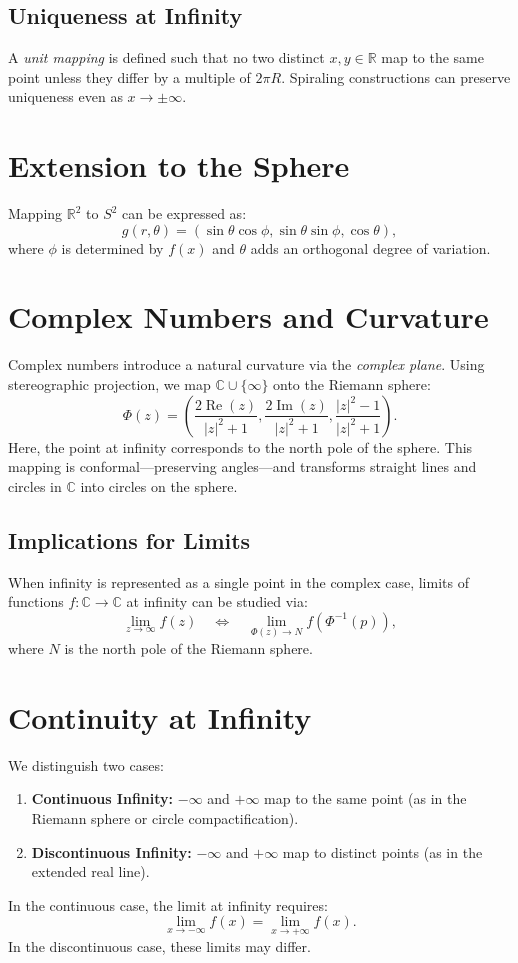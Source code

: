 \documentclass[12pt]{article}
\begin{document}
\subsection{Uniqueness at Infinity}
A \emph{unit mapping} is defined such that no two distinct $x,y \in \mathbb{R}$ map to the same point unless they differ by a multiple of $2\pi R$. Spiraling constructions can preserve uniqueness even as $x \to \pm\infty$.

\section{Extension to the Sphere}
Mapping $\mathbb{R}^2$ to $S^2$ can be expressed as:
\begin{equation}
g(r, \theta) = (\sin\theta \cos\phi, \sin\theta \sin\phi, \cos\theta),
\end{equation}
where $\phi$ is determined by $f(x)$ and $\theta$ adds an orthogonal degree of variation.

\section{Complex Numbers and Curvature}
Complex numbers introduce a natural curvature via the \emph{complex plane}. Using stereographic projection, we map $\mathbb{C} \cup \{\infty\}$ onto the Riemann sphere:
\begin{equation}
\Phi(z) = \left( \frac{2 \operatorname{Re}(z)}{|z|^2 + 1}, \frac{2 \operatorname{Im}(z)}{|z|^2 + 1}, \frac{|z|^2 - 1}{|z|^2 + 1} \right).
\end{equation}
Here, the point at infinity corresponds to the north pole of the sphere.  
This mapping is conformal—preserving angles—and transforms straight lines and circles in $\mathbb{C}$ into circles on the sphere.

\subsection{Implications for Limits}
When infinity is represented as a single point in the complex case, limits of functions $f: \mathbb{C} \to \mathbb{C}$ at infinity can be studied via:
\[
\lim_{z \to \infty} f(z) \quad \Leftrightarrow \quad \lim_{\Phi(z) \to N} f(\Phi^{-1}(p)),
\]
where $N$ is the north pole of the Riemann sphere.

\section{Continuity at Infinity}
We distinguish two cases:
\begin{enumerate}
    \item \textbf{Continuous Infinity:} $-\infty$ and $+\infty$ map to the same point (as in the Riemann sphere or circle compactification).
    \item \textbf{Discontinuous Infinity:} $-\infty$ and $+\infty$ map to distinct points (as in the extended real line).
\end{enumerate}
In the continuous case, the limit at infinity requires:
\[
\lim_{x \to -\infty} f(x) = \lim_{x \to +\infty} f(x).
\]
In the discontinuous case, these limits may differ.
\end{document}
